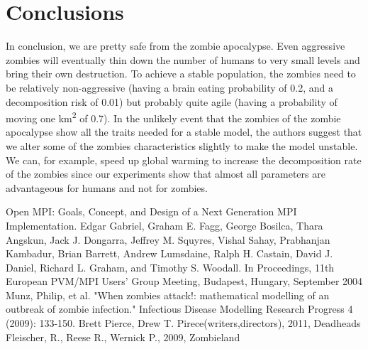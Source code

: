 \documentclass{report}
\begin{document}
\section{Conclusions}
In conclusion, we are pretty safe from the zombie apocalypse. Even aggressive zombies will eventually thin down the number of humans to very small levels and bring their own destruction. To achieve a stable population, the zombies need to be relatively non-aggressive (having a brain eating probability of 0.2, and a decomposition risk of 0.01) but probably quite agile (having a probability of moving one km\textsuperscript{2} of 0.7). In the unlikely event that the zombies of the zombie apocalypse show all the traits needed for a stable model, the authors suggest that we alter some of the zombies characteristics slightly to make the model unstable. We can, for example, speed up global warming to increase the decomposition rate of the zombies since our experiments show that almost all parameters are advantageous for humans and not for zombies.

\begin{thebibliography}{99}
Open MPI: Goals, Concept, and Design of a Next Generation MPI Implementation. Edgar Gabriel, Graham E. Fagg, George Bosilca, Thara Angskun, Jack J. Dongarra, Jeffrey M. Squyres, Vishal Sahay, Prabhanjan Kambadur, Brian Barrett, Andrew Lumsdaine, Ralph H. Castain, David J. Daniel, Richard L. Graham, and Timothy S. Woodall. In Proceedings, 11th European PVM/MPI Users' Group Meeting, Budapest, Hungary, September 2004
Munz, Philip, et al. "When zombies attack!: mathematical modelling of an outbreak of zombie infection." Infectious Disease Modelling Research Progress 4 (2009): 133-150.
Brett Pierce, Drew T. Pirece(writers,directors), 2011, Deadheads
Fleischer, R., Reese R., Wernick P., 2009, Zombieland 
\end{thebibliography}
\end{document}

